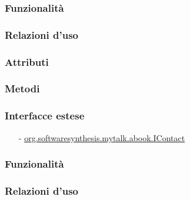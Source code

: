 \subsubsection*{Funzionalità}

\subsubsection*{Relazioni d'uso}

\subsubsection*{Attributi}

\subsubsection*{Metodi}

\subsubsection*{Interfacce estese}
\begin{itemize}[noitemsep,nolistsep]
  \item[-] \hyperref[IContact]{\ttfamily{}org.softwaresynthesis.mytalk.abook.IContact}
\end{itemize}

\subsubsection*{Funzionalità}

\subsubsection*{Relazioni d'uso}

